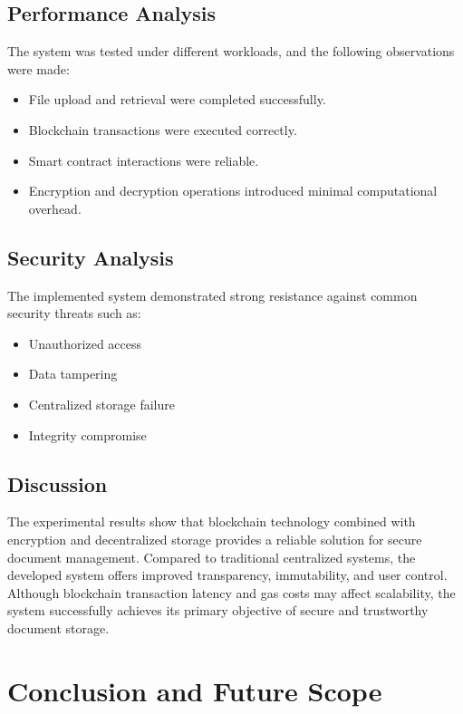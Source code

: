 \documentclass[12pt]{article}
\begin{document}
\subsection{Performance Analysis}
The system was tested under different workloads, and the following observations were made:

\begin{itemize}
    \item File upload and retrieval were completed successfully.
    \item Blockchain transactions were executed correctly.
    \item Smart contract interactions were reliable.
    \item Encryption and decryption operations introduced minimal computational overhead.
\end{itemize}

\subsection{Security Analysis}
The implemented system demonstrated strong resistance against common security threats such as:

\begin{itemize}
    \item Unauthorized access
    \item Data tampering
    \item Centralized storage failure
    \item Integrity compromise
\end{itemize}

\subsection{Discussion}
The experimental results show that blockchain technology combined with encryption and decentralized storage provides a reliable solution for secure document management. Compared to traditional centralized systems, the developed system offers improved transparency, immutability, and user control. Although blockchain transaction latency and gas costs may affect scalability, the system successfully achieves its primary objective of secure and trustworthy document storage.

\newpage
\section{Conclusion and Future Scope}
\end{document}
